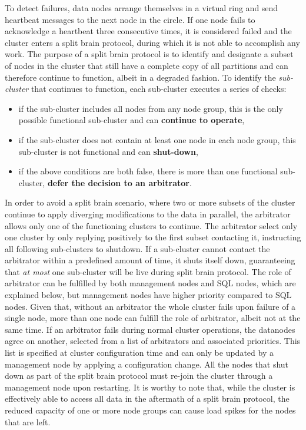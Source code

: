 To detect failures, data nodes arrange themselves in a virtual ring and send heartbeat messages to the next node in the circle.
If one node fails to acknowledge a heartbeat three consecutive times, it is considered failed and the cluster enters a split brain protocol, during which it is not able to accomplish any work.
The purpose of a split brain protocol is to identify and designate a subset of nodes in the cluster that still have a complete copy of all partitions and can therefore continue to function, albeit in a degraded fashion.
To identify the \emph{sub-cluster} that continues to function, each sub-cluster executes a series of checks:
\begin{itemize}
    \item if the sub-cluster includes all nodes from any node group, this is the only possible functional sub-cluster and can \textbf{continue to operate},
    \item if the sub-cluster does not contain at least one node in each node group, this sub-cluster is not functional and can \textbf{shut-down},
    \item if the above conditions are both false, there is more than one functional sub-cluster, \textbf{defer the decision to an arbitrator}.
\end{itemize}
In order to avoid a split brain scenario, where two or more subsets of the cluster continue to apply diverging modifications to the data in parallel, the arbitrator allows only one of the functioning clusters to continue.
The arbitrator select only one cluster by only replying positively to the first subset contacting it, instructing all following sub-clusters to shutdown.
If a sub-cluster cannot contact the arbitrator within a predefined amount of time, it shuts itself down, guaranteeing that \emph{at most} one sub-cluster will be live during split brain protocol.
The role of arbitrator can be fulfilled by both management nodes and SQL nodes, which are explained below, but management nodes have higher priority compared to SQL nodes.
Given that, without an arbitrator the whole cluster fails upon failure of a single node, more than one node can fulfill the role of arbitrator, albeit not at the same time.
If an arbitrator fails during normal cluster operations, the datanodes agree on another, selected from a list of arbitrators and associated priorities.
This list is specified at cluster configuration time and can only be updated by a management node by applying a configuration change.
All the nodes that shut down as part of the split brain protocol must re-join the cluster through a management node upon restarting.
It is worthy to note that, while the cluster is effectively able to access all data in the aftermath of a split brain protocol, the reduced capacity of one or more node groups can cause load spikes for the nodes that are left.

